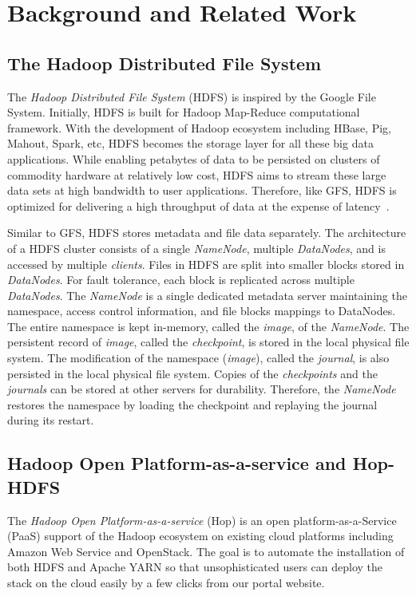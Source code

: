 \documentclass[runningheads,a4paper]{llncs}
\begin{document}
\section{Background and Related Work}
\subsection{The Hadoop Distributed File System}
The \textit{Hadoop Distributed File System} (HDFS) is inspired by the Google File System. Initially, HDFS is built for Hadoop Map-Reduce computational framework. With the development of Hadoop ecosystem including HBase, Pig, Mahout, Spark, etc, HDFS becomes the storage layer for all these big data applications. While enabling petabytes of data to be persisted on clusters of commodity hardware at relatively low cost, HDFS aims to stream these large data sets at high bandwidth to user applications. Therefore, like GFS, HDFS is optimized for delivering a high throughput of data at the expense of latency~\cite{white2012hadoop}.

Similar to GFS, HDFS stores metadata and file data separately. The architecture of a HDFS cluster consists of a single \textit{NameNode}, multiple \textit{DataNodes}, and is accessed by multiple \textit{clients}. Files in HDFS are split into smaller blocks stored in \textit{DataNodes}. For fault tolerance, each block is replicated across multiple \textit{DataNodes}. The \textit{NameNode} is a single dedicated metadata server maintaining the namespace, access control information, and file blocks mappings to DataNodes. The entire namespace is kept in-memory, called the \textit{image}, of the \textit{NameNode}. The persistent record of \textit{image}, called the \textit{checkpoint}, is stored in the local physical file system. The modification of the namespace (\textit{image}), called the \textit{journal}, is also persisted in the local physical file system. Copies of the \textit{checkpoints} and the \textit{journals} can be stored at other servers for durability. Therefore, the \textit{NameNode} restores the namespace by loading the checkpoint and replaying the journal during its restart.

\subsection{Hadoop Open Platform-as-a-service and Hop-HDFS}
The \textit{Hadoop Open Platform-as-a-service} (Hop) is an open platform-as-a-Service (PaaS) support of the Hadoop ecosystem on existing cloud platforms including Amazon Web Service and OpenStack. The goal is to automate the installation of both HDFS and Apache YARN so that unsophisticated users can deploy the stack on the cloud easily by a few clicks from our portal website.
\end{document}
